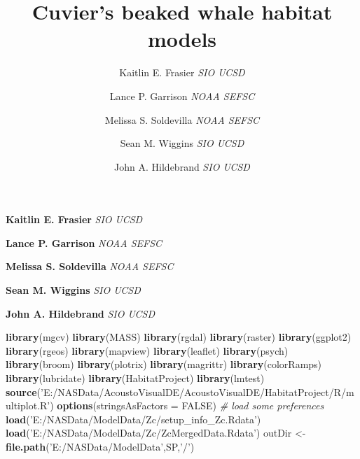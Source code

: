\documentclass[11pt,]{article}
\title{Cuvier's beaked whale habitat models  }
\author{\Large Kaitlin E. Frasier\vspace{0.05in} \newline\normalsize\emph{SIO UCSD}   \and \Large Lance P. Garrison\vspace{0.05in} \newline\normalsize\emph{NOAA SEFSC}   \and \Large Melissa S. Soldevilla\vspace{0.05in} \newline\normalsize\emph{NOAA SEFSC}   \and \Large Sean M. Wiggins\vspace{0.05in} \newline\normalsize\emph{SIO UCSD}   \and \Large John A. Hildebrand\vspace{0.05in} \newline\normalsize\emph{SIO UCSD}  }
\date{}
\newcommand*{\authorfont}{\fontfamily{phv}\selectfont}
\newenvironment{Shaded}{\begin{snugshade}}{\end{snugshade}}
\newcommand{\KeywordTok}[1]{\textcolor[rgb]{0.13,0.29,0.53}{\textbf{{#1}}}}
\newcommand{\DataTypeTok}[1]{\textcolor[rgb]{0.13,0.29,0.53}{{#1}}}
\newcommand{\StringTok}[1]{\textcolor[rgb]{0.31,0.60,0.02}{{#1}}}
\newcommand{\CommentTok}[1]{\textcolor[rgb]{0.56,0.35,0.01}{\textit{{#1}}}}
\newcommand{\OtherTok}[1]{\textcolor[rgb]{0.56,0.35,0.01}{{#1}}}
\newcommand{\NormalTok}[1]{{#1}}
\begin{document}
	
%

{%
\setlength{\parindent}{0pt}
\thispagestyle{plain}
{\fontsize{18}{20}\selectfont\raggedright 
\maketitle  %

}

{
   \vskip 13.5pt\relax \normalsize\fontsize{11}{12} 
\textbf{\authorfont Kaitlin E. Frasier} \hskip 15pt \emph{\small SIO UCSD}   \par \textbf{\authorfont Lance P. Garrison} \hskip 15pt \emph{\small NOAA SEFSC}   \par \textbf{\authorfont Melissa S. Soldevilla} \hskip 15pt \emph{\small NOAA SEFSC}   \par \textbf{\authorfont Sean M. Wiggins} \hskip 15pt \emph{\small SIO UCSD}   \par \textbf{\authorfont John A. Hildebrand} \hskip 15pt \emph{\small SIO UCSD}   

}

}






\vskip 6.5pt


\noindent  \begin{Shaded}
\begin{Highlighting}[]
\KeywordTok{library}\NormalTok{(mgcv)}
\KeywordTok{library}\NormalTok{(MASS)}
\KeywordTok{library}\NormalTok{(rgdal)}
\KeywordTok{library}\NormalTok{(raster)}
\KeywordTok{library}\NormalTok{(ggplot2)}
\KeywordTok{library}\NormalTok{(rgeos)}
\KeywordTok{library}\NormalTok{(mapview)}
\KeywordTok{library}\NormalTok{(leaflet)}
\KeywordTok{library}\NormalTok{(psych)}
\KeywordTok{library}\NormalTok{(broom)}
\KeywordTok{library}\NormalTok{(plotrix)}
\KeywordTok{library}\NormalTok{(magrittr)}
\KeywordTok{library}\NormalTok{(colorRamps)}
\KeywordTok{library}\NormalTok{(lubridate)}
\KeywordTok{library}\NormalTok{(HabitatProject)}
\KeywordTok{library}\NormalTok{(lmtest)}
\KeywordTok{source}\NormalTok{(}\StringTok{'E:/NASData/AcoustoVisualDE/AcoustoVisualDE/HabitatProject/R/multiplot.R'}\NormalTok{)}
\KeywordTok{options}\NormalTok{(}\DataTypeTok{stringsAsFactors =} \OtherTok{FALSE}\NormalTok{)}
\CommentTok{# load some preferences}
\KeywordTok{load}\NormalTok{(}\StringTok{'E:/NASData/ModelData/Zc/setup_info_Zc.Rdata'}\NormalTok{)}
\KeywordTok{load}\NormalTok{(}\StringTok{'E:/NASData/ModelData/Zc/ZcMergedData.Rdata'}\NormalTok{)}
\NormalTok{outDir <-}\StringTok{ }\KeywordTok{file.path}\NormalTok{(}\StringTok{'E:/NASData/ModelData'}\NormalTok{,SP,}\StringTok{'/'}\NormalTok{)}
\end{Highlighting}
\end{Shaded}
\end{document}
